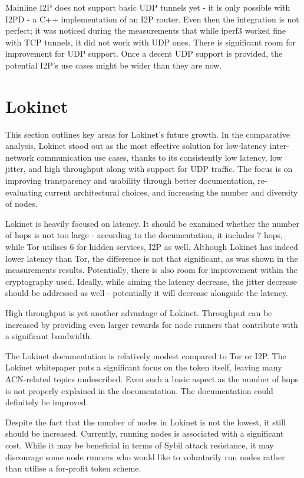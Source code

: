 Mainline I2P does not support basic UDP tunnels yet - it is only possible with I2PD - a C++ implementation of an I2P router. Even then the integration is not perfect; it was noticed during the measurements that while iperf3 worked fine with TCP tunnels, it did not work with UDP ones. There is significant room for improvement for UDP support. Once a decent UDP support is provided, the potential I2P's use cases might be wider than they are now.


\section{Lokinet}

This section outlines key areas for Lokinet’s future growth. In the comparative analysis, Lokinet stood out as the most effective solution for low-latency inter-network communication use cases, thanks to its consistently low latency, low jitter, and high throughput along with support for UDP traffic. The focus is on improving transparency and usability through better documentation, re-evaluating current architectural choices, and increasing the number and diversity of nodes.

Lokinet is heavily focused on latency. It should be examined whether the number of hops is not too large - according to the documentation, it includes 7 hops, while Tor utilises 6 for hidden services, I2P as well. Although Lokinet has indeed lower latency than Tor, the difference is not that significant, as was shown in the measurements results. Potentially, there is also room for improvement within the cryptography used. Ideally, while aiming the latency decrease, the jitter decrease should be addressed as well - potentially it will decrease alongside the latency. 

High throughput is yet another advantage of Lokinet. Throughput can be increased by providing even larger rewards for node runners that contribute with a significant bandwidth.

The Lokinet documentation is relatively modest compared to Tor or I2P. The Lokinet whitepaper puts a significant focus on the token itself, leaving many ACN-related topics undescribed. Even such a basic aspect as the number of hops is not properly explained in the documentation. The documentation could definitely be improved.

Despite the fact that the number of nodes in Lokinet is not the lowest, it still should be increased. Currently, running nodes is associated with a significant cost. While it may be beneficial in terms of Sybil attack resistance, it may discourage some node runners who would like to voluntarily run nodes rather than utilise a for-profit token scheme.



